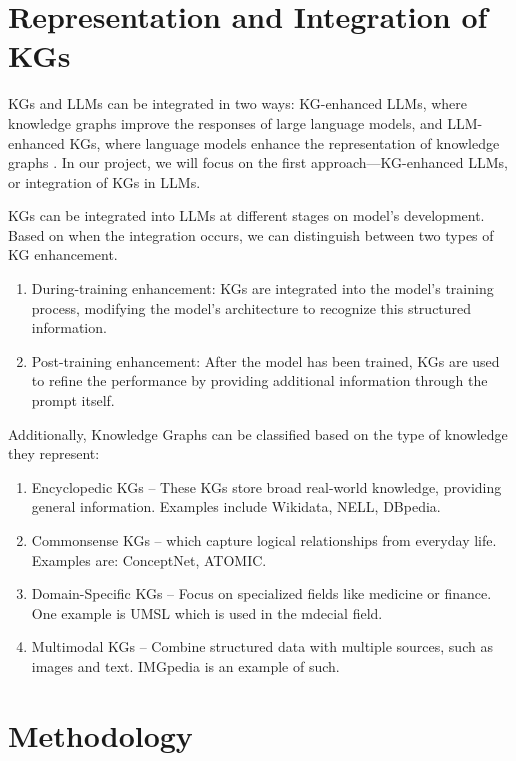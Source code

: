 \documentclass[fleqn,moreauthors,10pt]{ds_report}
\begin{document}
\section*{Representation and Integration of KGs}

KGs and LLMs can be integrated in two ways: KG-enhanced LLMs, where knowledge graphs improve the responses of large language models, and LLM-enhanced KGs, where language models enhance the representation of knowledge graphs \cite{Pan2024UnifyingLLMKG}. In our project, we will focus on the first approach—KG-enhanced LLMs, or integration of KGs in LLMs.



 
 KGs can be integrated into LLMs at different stages on model's development. Based on when the integration occurs, we can distinguish between two types of KG enhancement.  


\begin{enumerate}
    \item During-training enhancement: KGs are integrated into the model’s training process, modifying the model's architecture to recognize this structured information.
    \item Post-training enhancement: After the model has been trained, KGs are used to refine the performance by providing additional information through the prompt itself.
\end{enumerate}



Additionally, Knowledge Graphs can be classified based on the type of knowledge they represent:
 \begin{enumerate}
     \item Encyclopedic KGs – These KGs store broad real-world knowledge, providing general information. Examples include Wikidata, NELL, DBpedia.
     \item Commonsense KGs – which capture logical relationships from everyday life. Examples are: ConceptNet, ATOMIC. 
     \item Domain-Specific KGs – Focus on specialized fields like medicine or finance. One example is UMSL which is used in the mdecial field. 
     \item Multimodal KGs – Combine structured data with multiple sources, such as images and text. IMGpedia is an example of such.
 \end{enumerate}
 





\section*{Methodology}
\end{document}
